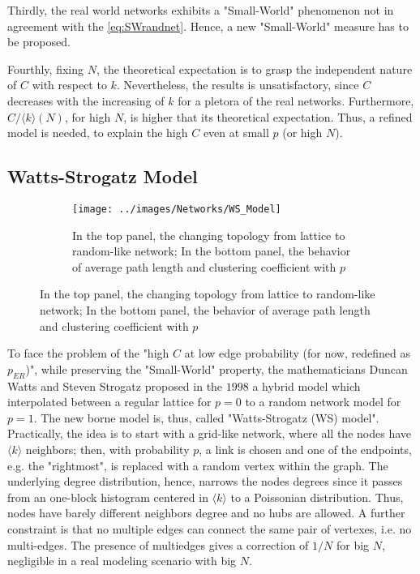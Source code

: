 \documentclass[a4paper,10pt,twoside]{book} %
\theoremstyle{definition}
\begin{document}
Thirdly, the real world networks exhibits a "Small-World" phenomenon not in agreement with the \autoref{eq:SWrandnet}. Hence, a new "Small-World" measure has to be proposed.

Fourthly, fixing $N$, the theoretical expectation is to grasp the independent nature of $C$ with respect to $k$. Nevertheless, the results is unsatisfactory, since $C$ decreases with the increasing of $k$ for a pletora of the real networks.
Furthermore, $C/\langle k \rangle (N)$, for high $N$, is higher that its theoretical expectation. Thus, a refined model is needed, to explain the high $C$ even at small $p$ (or high $N$).

\subsection{Watts-Strogatz Model}
\label{sec:WS_Model}
\begin{figure}[ht]
    \begin{subfigure}{\textwidth}
        \texttt{[image: ../images/Networks/WS\_Model]}
        \centering
        \caption{In the top panel, the changing topology from lattice to random-like network; In the bottom panel, the behavior of average path length and clustering coefficient with $p$ \cite{Olaf:2011_NonRandomBrain}}
        \label{fig:WSmodel}
    \end{subfigure}
\end{figure}

To face the problem of the "high $C$ at low edge probability (for now, redefined as $p_{ER}$)", while preserving the "Small-World" property, the mathematicians Duncan Watts and Steven Strogatz proposed in the $1998$ a hybrid model which interpolated between a regular lattice for $p = 0$ to a random network model for $p = 1$. The new borne model is, thus, called "Watts-Strogatz (WS) model".
Practically, the idea is to start with a grid-like network, where all the nodes have $\langle k \rangle$ neighbors; then, with probability $p$, a link is chosen and one of the endpoints, e.g. the "rightmost", is replaced with a random vertex within the graph. The underlying degree distribution, hence, narrows the nodes degrees since it passes from an one-block histogram centered in $\langle k \rangle$ to a Poissonian distribution. Thus, nodes have barely different neighbors degree and no hubs are allowed.
A further constraint is that no multiple edges can connect the same pair of vertexes, i.e. no multi-edges. The presence of multiedges gives a correction of $1/N$ for big $N$, negligible in a real modeling scenario with big $N$.
\end{document}
